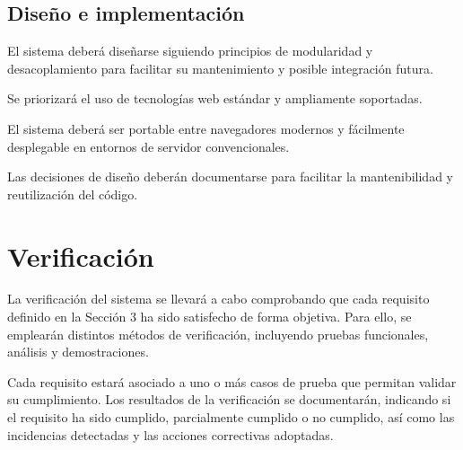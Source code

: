 \subsection{Diseño e implementación}

El sistema deberá diseñarse siguiendo principios de modularidad y desacoplamiento para facilitar su mantenimiento y posible integración futura.

 Se priorizará el uso de tecnologías web estándar y ampliamente soportadas.

 El sistema deberá ser portable entre navegadores modernos y fácilmente desplegable en entornos de servidor convencionales.

 Las decisiones de diseño deberán documentarse para facilitar la mantenibilidad y reutilización del código.

\section{Verificación}

La verificación del sistema se llevará a cabo comprobando que cada requisito definido en la Sección 3 ha sido satisfecho de forma objetiva. Para ello, se emplearán distintos métodos de verificación, incluyendo pruebas funcionales, análisis y demostraciones.

Cada requisito estará asociado a uno o más casos de prueba que permitan validar su cumplimiento. Los resultados de la verificación se documentarán, indicando si el requisito ha sido cumplido, parcialmente cumplido o no cumplido, así como las incidencias detectadas y las acciones correctivas adoptadas.